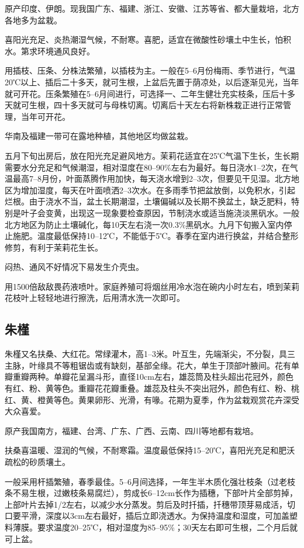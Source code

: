 \documentclass{ctexbook}
\begin{document}
原产印度、伊朗。现我国广东、福建、浙江、安徽、江苏等省、都大量栽培，北方各地多为盆栽。

喜阳光充足、炎热潮湿气候，不耐寒。喜肥，适宜在微酸性砂壤土中生长，怕积水。第求环境通风良好。

用插枝、压条、分株法繁殖，以插枝为主。一般在5--6月份梅雨、季节进行，气温20℃以上、插后二十多天，就可生根，上盆后先置于荫凉处，以后逐渐见光，当年就可开花。压条繁殖在5--6月间进行，可选择一、二年生健壮充实枝条，压后十多天就可生根，四十多天就可与母株切离。切离后十天左右将新株栽正进行正常管理，当年可开花。

华南及福建一带可在露地种植，其他地区均做盆栽。

五月下旬出房后，放在阳光充足避风地方。茉莉花适宜在25℃气温下生长，生长期需要水分充足和气候潮湿，相对湿度在80--90\%左右为最好。每日浇水1--2次，在气温最高7--8月份，叶面蒸腾作用加快，每天浇水增到2--3次，但要见干见湿。北方地区为增加湿度，每天在叶面喷洒2--3次水。在多雨季节把盆放倒，以免积水，引起烂根。由于浇水不当，盆土长期潮湿，土壤偏碱以及长期不换盆土，缺乏肥料，特别是叶子会变黄，出现这一现象要检查原因，节制浇水或适当施浇淡黑矾水。一般北方地区为防止土壤碱化，每10天左右浇一次0.3\%黑矾水。九月下旬搬入室内停止施肥。温度最低保持10--12℃，不能低于5℃。春季在室内进行换盆，并结合整形修剪，有利于茉莉花生长。

闷热、通风不好情况下易发生介壳虫。

用1500倍敌敌畏药液喷叶。家庭养殖可将烟丝用冷水泡在碗内小时左右，喷到茉莉花枝叶上轻轻地进行擦洗，后用清水洗一次即可。
\subsection{朱槿}
朱槿又名扶桑、大红花。常绿灌木，高1--3米。叶互生，先端渐尖，不分裂，具三主脉，叶缘具不等粗锯齿或有缺刻，基部全缘。花大，单生于顶部叶腋间。花有单瓣重瓣两种。单瓣花呈漏斗形，直径10cm左右，雄蕊筒及柱头超出花冠外，颜色有红、粉、黄等色。重瓣花花瓣重叠。雄蕊及柱头不突出冠外，颜色有红、粉、桃红、黄、橙黄等色。黄果卵形、光滑，有喙。花期为夏季，作为盆栽观赏花卉深受大众喜爱。

原产我国南方，福建、台湾、广东、广西、云南、四川等地都有栽培。

扶桑喜温暖、湿润的气候，不耐寒霜。温度最低保持15--20℃，喜阳光充足和肥沃疏松的砂质壤土。

一般采用杆插繁殖，春季最佳。5--6月间选择，一年生半木质化强壮枝条（过老枝条不易生根，过嫩枝条易腐烂），剪成长6--12cm长作为插穗，下部叶片全部剪掉，上部叶片去掉1/2左右，以减少水分蒸发。剪后及时扦插，扦穗带顶芽易成活，切口要平滑，深度以3cm左右最好，插后立即浇透水。为保持温度和湿度，可加盖塑料薄膜。要求温度20--25℃，相对湿度为85--95\%；30天左右即可生根，二个月后就可上盆。
\end{document}
